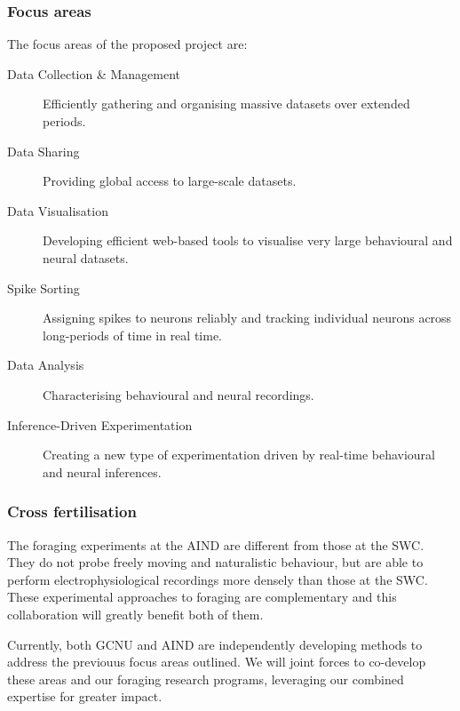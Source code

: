 \subsubsection{Focus areas}

The focus areas of the proposed project are:

\begin{description}

    \item[Data Collection \& Management] Efficiently gathering and organising
        massive datasets over extended periods.

    \item[Data Sharing] Providing global access to large-scale datasets.

    \item[Data Visualisation] Developing efficient web-based tools to visualise
        very large behavioural and neural datasets.

    \item[Spike Sorting] Assigning spikes to neurons reliably and tracking
        individual neurons across long-periods of time in real time.

    \item[Data Analysis] Characterising behavioural and neural recordings.

    \item[Inference-Driven Experimentation] Creating a new type of
        experimentation driven by real-time behavioural and neural inferences.

\end{description}

\subsubsection{Cross fertilisation}

The foraging experiments at the AIND are different from those at the SWC. They
do not probe freely moving and naturalistic behaviour, but are able to perform
electrophysiological recordings more densely than those at the SWC.
%
These experimental approaches to foraging are complementary and this
collaboration will greatly benefit both of them.

Currently, both GCNU and AIND are independently developing methods to address
the previouus focus areas outlined. We will joint forces
to co-develop these areas and our foraging research programs, leveraging our
combined expertise for greater impact.
